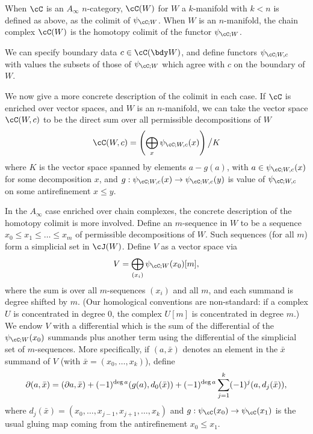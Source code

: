 \begin{defn}
When $\cC$ is an $A_\infty$ $n$-category, $\cC(W)$ for $W$ a $k$-manifold with $k < n$ is defined as above, as the colimit of $\psi_{\cC;W}$. When $W$ is an $n$-manifold, the chain complex $\cC(W)$ is the homotopy colimit of the functor $\psi_{\cC;W}$.
\end{defn}

We can specify boundary data $c \in \cC(\bdy W)$, and define functors $\psi_{\cC;W,c}$ with values the subsets of those of $\psi_{\cC;W}$ which agree with $c$ on the boundary of $W$.

We now give a more concrete description of the colimit in each case. If $\cC$ is enriched over vector spaces, and $W$ is an $n$-manifold, we can take the vector space $\cC(W,c)$ to be the direct sum over all permissible decompositions of $W$
\begin{equation*}
	\cC(W,c) = \left( \bigoplus_x \psi_{\cC;W,c}(x)\right) \big/ K
\end{equation*}
where $K$ is the vector space spanned by elements $a - g(a)$, with
$a\in \psi_{\cC;W,c}(x)$ for some decomposition $x$, and $g: \psi_{\cC;W,c}(x)
\to \psi_{\cC;W,c}(y)$ is value of $\psi_{\cC;W,c}$ on some antirefinement $x \leq y$.

In the $A_\infty$ case enriched over chain complexes, the concrete description of the homotopy colimit
is more involved.
Define an $m$-sequence in $W$ to be a sequence $x_0 \le x_1 \le \dots \le x_m$ of permissible decompositions of $W$.
Such sequences (for all $m$) form a simplicial set in $\cJ(W)$.
Define $V$ as a vector space via
\[
	V = \bigoplus_{(x_i)} \psi_{\cC;W}(x_0)[m] ,
\]
where the sum is over all $m$-sequences $(x_i)$ and all $m$, and each summand is degree shifted by $m$. (Our homological conventions are non-standard: if a complex $U$ is concentrated in degree $0$, the complex $U[m]$ is concentrated in degree $m$.)
We endow $V$ with a differential which is the sum of the differential of the $\psi_{\cC;W}(x_0)$
summands plus another term using the differential of the simplicial set of $m$-sequences.
More specifically, if $(a, \bar{x})$ denotes an element in the $\bar{x}$
summand of $V$ (with $\bar{x} = (x_0,\dots,x_k)$), define
\[
	\partial (a, \bar{x}) = (\partial a, \bar{x}) + (-1)^{\deg{a}} (g(a), d_0(\bar{x})) + (-1)^{\deg{a}} \sum_{j=1}^k (-1)^{j} (a, d_j(\bar{x})) ,
\]
where $d_j(\bar{x}) = (x_0,\dots,x_{j-1},x_{j+1},\dots,x_k)$ and $g: \psi_\cC(x_0)\to \psi_\cC(x_1)$
is the usual gluing map coming from the antirefinement $x_0 \le x_1$.

